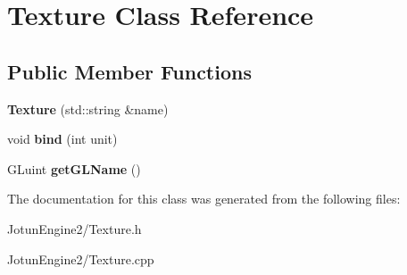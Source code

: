 \hypertarget{class_texture}{\section{Texture Class Reference}
\label{class_texture}
}
\subsection*{Public Member Functions}
\begin{DoxyCompactItemize}
\item 
\hypertarget{class_texture_a84c7e18fd0fe150a112c0f91e9b643eb}{{\bfseries Texture} (std\-::string \&name)}\label{class_texture_a84c7e18fd0fe150a112c0f91e9b643eb}

\item 
\hypertarget{class_texture_ab13af2ee5ae56a8d74074fdf66100cd7}{void {\bfseries bind} (int unit)}\label{class_texture_ab13af2ee5ae56a8d74074fdf66100cd7}

\item 
\hypertarget{class_texture_ac00c7ad03134ffb35987891627ef8cff}{G\-Luint {\bfseries get\-G\-L\-Name} ()}\label{class_texture_ac00c7ad03134ffb35987891627ef8cff}

\end{DoxyCompactItemize}


The documentation for this class was generated from the following files\-:\begin{DoxyCompactItemize}
\item 
Jotun\-Engine2/Texture.\-h\item 
Jotun\-Engine2/Texture.\-cpp\end{DoxyCompactItemize}
